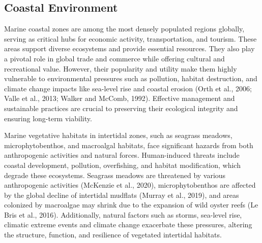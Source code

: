 \documentclass[
  letterpaper,
  11pt,
  english,
  singlespacing,
  headsepline]{MastersDoctoralThesis}
\begin{document}
\begin{spacing}{1.5}

\section{Coastal Environment}\label{coastal-environment}

Marine coastal zones are among the most densely populated regions
globally, serving as critical hubs for economic activity,
transportation, and tourism. These areas support diverse ecosystems and
provide essential resources. They also play a pivotal role in global
trade and commerce while offering cultural and recreational value.
However, their popularity and utility make them highly vulnerable to
environmental pressures such as pollution, habitat destruction, and
climate change impacts like sea-level rise and coastal erosion (Orth et
al., 2006; Valle et al., 2013; Walker and McComb, 1992). Effective
management and sustainable practices are crucial to preserving their
ecological integrity and ensuring long-term viability.

Marine vegetative habitats in intertidal zones, such as seagrass
meadows, microphytobenthos, and macroalgal habitats, face significant
hazards from both anthropogenic activities and natural forces.
Human-induced threats include coastal development, pollution,
overfishing, and habitat modification, which degrade these ecosystems.
Seagrass meadows are threatened by various anthropogenic activities
(McKenzie et al., 2020), microphytobenthos are affected by the global
decline of intertidal mudflats (Murray et al., 2019), and areas
colonized by macroalgae may shrink due to the expansion of wild oyster
reefs (Le Bris et al., 2016). Additionally, natural factors such as
storms, sea-level rise, climatic extreme events and climate change
exacerbate these pressures, altering the structure, function, and
resilience of vegetated intertidal habitats.


\end{spacing}
\end{document}
